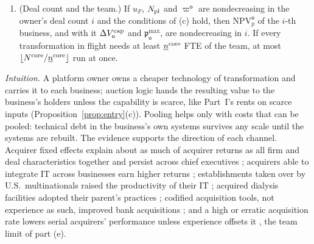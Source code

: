 \begin{proposition}
\begin{enumerate}
\begin{equation}\label{eq:acq-pmax}
\mathfrak p^{\max}_{\mathsf o}=\mathfrak p^{\max}_{\rm pe}+\Delta V^{\rm cap}_{\mathsf o}/P_0 .
\end{equation}
The business is worth more to the owner than to itself if and only if $V^{\rm prog}(\Pi^{\mathsf o};\mathcal U_{\mathsf o})-V^{\rm prog}(\Pi^{\rm pub};\mathcal U_i)>C_{\rm tx}+e^{-r_wT}p_bL_b$, and more than to a sponsor without a platform if and only if $\Delta V^{\rm cap}_{\mathsf o}>0$. If the business goes to the highest valuation at the second-highest price, the winner keeps only its valuation in excess of the runner-up's: capability that rivals also hold earns its holder nothing.
\item[(e)] (Deal count and the team.) If $u_F$, $N_{\rm pl}$ and $\varpi^{\mathsf o}$ are nondecreasing in the owner's deal count $i$ and the conditions of (c) hold, then $\mathrm{NPV}^{\mathsf o}_p$ of the $i$-th business, and with it $\Delta V^{\rm cap}_{\mathsf o}$ and $\mathfrak p^{\max}_{\mathsf o}$, are nondecreasing in $i$. If every transformation in flight needs at least $\underline n^{\rm core}$ FTE of the team, at most $\lfloor N^{\rm core}/\underline n^{\rm core}\rfloor$ run at once.
\end{enumerate}
\end{proposition}

\noindent\emph{Intuition.} A platform owner owns a cheaper technology of transformation and carries it to each business; auction logic hands the resulting value to the business's holders unless the capability is scarce, like Part~I's rents on scarce inputs (Proposition~\ref{prop:entry}(c)). Pooling helps only with costs that can be pooled: technical debt in the business's own systems survives any scale until the systems are rebuilt. The evidence supports the direction of each channel. Acquirer fixed effects explain about as much of acquirer returns as all firm and deal characteristics together and persist across chief executives \citep{golubov2015extraordinary}; acquirers able to integrate IT across businesses earn higher returns \citep{tanriverdi2011cross}; establishments taken over by U.S.\ multinationals raised the productivity of their IT \citep{bloom2012americans}; acquired dialysis facilities adopted their parent's practices \citep{eliason2020how}; codified acquisition tools, not experience as such, improved bank acquisitions \citep{zollo2004deliberate}; and a high or erratic acquisition rate lowers serial acquirers' performance unless experience offsets it \citep{laamanen2008performance}, the team limit of part (e).


